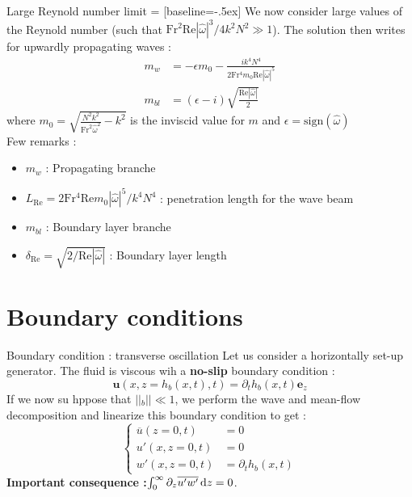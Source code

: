 \documentclass[10pt]{beamer}
\begin{document}
\begin{frame}[fragile]{Large Reynold number limit}
   = [baseline=-.5ex]
  We now consider large values of the Reynold number (such that $\mathrm{Fr}^2\mathrm{Re}\left\lvert\hat{\omega}\right\rvert^{3}/4k^{2}N^{2}\gg1$). The solution then writes for upwardly propagating waves :
  \begin{align*}
    m_{w}&= -\epsilon m_{0}-\frac{ik^{4}N^{4}}{2\mathrm{Fr^{4}}m_{0}\mathrm{Re}\left\lvert\hat{\omega}\right\rvert^{5}}\\
    m_{bl}&= \left(\epsilon-i\right)\sqrt{\frac{\mathrm{Re}\left\lvert\hat{\omega}\right\rvert}{2}}
  \end{align*}
  where $m_{0}=\sqrt{\frac{N^{2}k^{2}}{\mathrm{Fr}^{2}\hat{\omega}^{2}}-k^{2}}$ is the inviscid value for $m$ and $\epsilon=\mathrm{sign}\left(\hat{\omega}\right)$\\
  Few remarks :
  \begin{itemize}
    \item $m_{w}$ : Propagating branche
    \item $L_{\mathrm{Re}}=2\mathrm{Fr^{4}}\mathrm{Re}m_{0}\left\lvert\hat{\omega}\right\rvert^{5}/k^{4}N^{4}$ : penetration length for the wave beam
    \item $m_{bl}$ : Boundary layer branche
    \item $\delta_{\mathrm{Re}}=\sqrt{2/\mathrm{Re}\left\lvert\hat{\omega}\right\rvert}$ : Boundary layer length
  \end{itemize}
\end{frame}

\section{Boundary conditions}

\begin{frame}{Boundary condition : transverse oscillation}
	Let us consider a horizontally set-up generator. The fluid is viscous wih a \textbf{no\--slip} boundary condition :
	\begin{equation*}
		\mathbf{u}\left(x,z=h_{b}\left(x,t\right),t\right)=\partial_{t}h_{b}\left(x,t\right)\mathbf{e}_{z}
	\end{equation*}
	If we now su hppose that $\left\lvert\left\lvert_{b}\right\rvert\right\rvert\ll1$, we perform the wave and mean\--flow decomposition and linearize this boundary condition to get :
	\begin{equation*}
		\begin{cases}
			\overline{u}\left(z=0,t\right)&=0\\
			u'\left(x,z=0,t\right)&=0\\
			w'\left(x,z=0,t\right)&=\partial_{t}h_{b}\left(x,t\right)
		\end{cases}
	\end{equation*}
	\textbf{Important consequence :}$\intop_{0}^{\infty}\partial_{z}\overline{u'w'}\,\mathrm{d}z=0$.
\end{frame}
\end{document}
